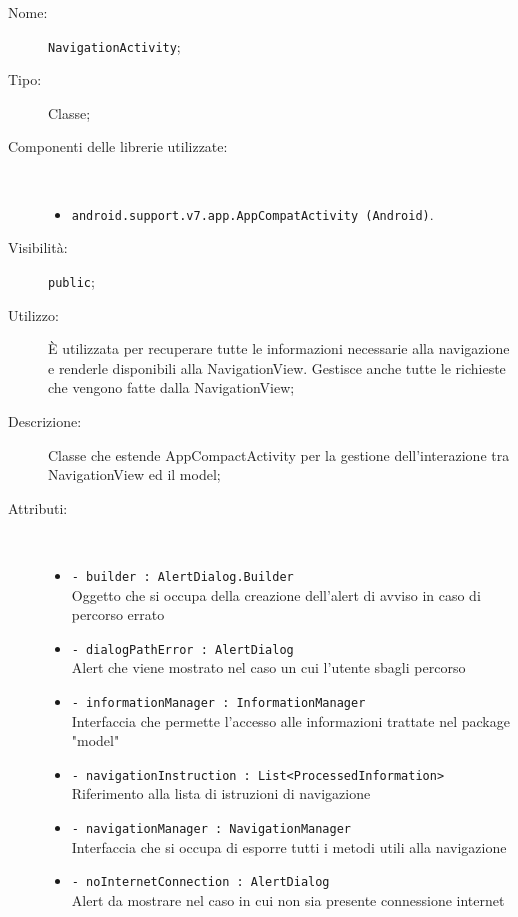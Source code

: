 \documentclass[../DefinizioneDiProdotto.tex]{subfiles}
\begin{document}
\begin{description}
	\item[Nome:] \texttt{NavigationActivity};
	\item[Tipo:] Classe;
	\item[Componenti delle librerie utilizzate:] \
	\begin{itemize}
		\item \texttt{android.support.v7.app.AppCompatActivity (Android)}.
		
	\end{itemize}
	\item[Visibilità:] \texttt{public};
	\item[Utilizzo:] È utilizzata per recuperare tutte le informazioni necessarie alla navigazione e renderle disponibili alla NavigationView. Gestisce anche tutte le richieste che vengono fatte dalla NavigationView;
	\item[Descrizione:] Classe che estende AppCompactActivity per la gestione dell'interazione tra NavigationView ed il model;
	\item[Attributi:] \
	\begin{itemize}
		\item \texttt{- builder : AlertDialog.Builder}\\
		Oggetto che si occupa della creazione dell'alert di avviso in caso di percorso errato
		
		\item \texttt{- dialogPathError : AlertDialog}\\
		Alert che viene mostrato nel caso un cui l'utente sbagli percorso
		
		\item \texttt{- informationManager : InformationManager}\\
		Interfaccia che permette l'accesso alle informazioni trattate nel package "model"
		
		\item \texttt{- navigationInstruction : List<ProcessedInformation>}\\
		Riferimento alla lista di istruzioni di navigazione
		
		\item \texttt{- navigationManager : NavigationManager}\\
		Interfaccia che si occupa di esporre tutti i metodi utili alla navigazione
		
		\item \texttt{- noInternetConnection : AlertDialog}\\
		Alert da mostrare nel caso in cui non sia presente connessione internet
		

\end{itemize}
\end{description}
\end{document}
